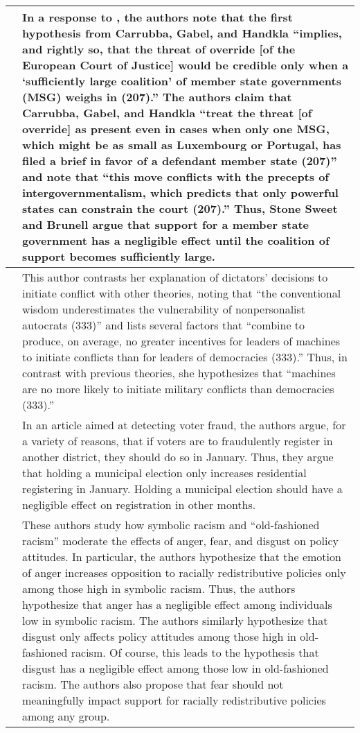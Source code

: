\documentclass[12pt]{article}
\begin{document}
\begin{center}
\begin{longtable}{p{5cm} p{10cm}}
\hline 
\cite{StoneSweet2012} & In a response to \cite{Carrubba2008}, the authors note that the first hypothesis from Carrubba, Gabel, and Handkla ``implies, and rightly so, that the threat of override [of the European Court of Justice] would be credible only when a `sufficiently large coalition' of member state governments (MSG) weighs in (207).'' The authors claim that  Carrubba, Gabel, and Handkla ``treat the threat [of override] as present even in cases when only one MSG, which might be as small as Luxembourg or Portugal, has filed a brief in favor of a defendant member state (207)'' and  note that ``this move conflicts with the precepts of intergovernmentalism, which predicts that only powerful states can constrain the court (207).'' Thus, Stone Sweet and Brunell argue that support for a member state government has a negligible effect until the coalition of support becomes sufficiently large.\\ 
\hline 
\cite{Weeks2012} & This author contrasts her explanation of dictators' decisions to initiate conflict with other theories, noting that ``the conventional wisdom underestimates the vulnerability of nonpersonalist autocrats (333)'' and lists several factors that ``combine to produce, on average, no greater incentives for leaders of machines to initiate conflicts than for leaders of democracies (333).'' Thus, in contrast with previous theories, she hypothesizes that ``machines are no more likely to initiate military conflicts than democracies (333).'' \\ 
\hline 
\cite{Fukumoto2011} & In an article aimed at detecting voter fraud, the authors argue, for a variety of reasons, that if voters are to fraudulently register in another district, they should do so in January. Thus, they argue that holding a municipal election only increases residential registering in January. Holding a municipal election should have a negligible effect on registration in other months. \\ 
\hline 
\cite{Banks2012} & These authors study how symbolic racism and ``old-fashioned racism'' moderate the effects of anger, fear, and disgust on policy attitudes. In particular, the authors hypothesize that the emotion of anger increases opposition to racially redistributive policies only among those high in symbolic racism. Thus, the authors hypothesize that anger has a negligible effect among individuals low in symbolic racism. The authors similarly hypothesize that disgust only affects policy attitudes among those high in old-fashioned racism. Of course, this leads to the hypothesis that disgust has a negligible effect among those low in old-fashioned racism. The authors also propose that fear should not meaningfully impact support for racially redistributive policies among any group.\\

\end{longtable}
\end{center}
\end{document}
